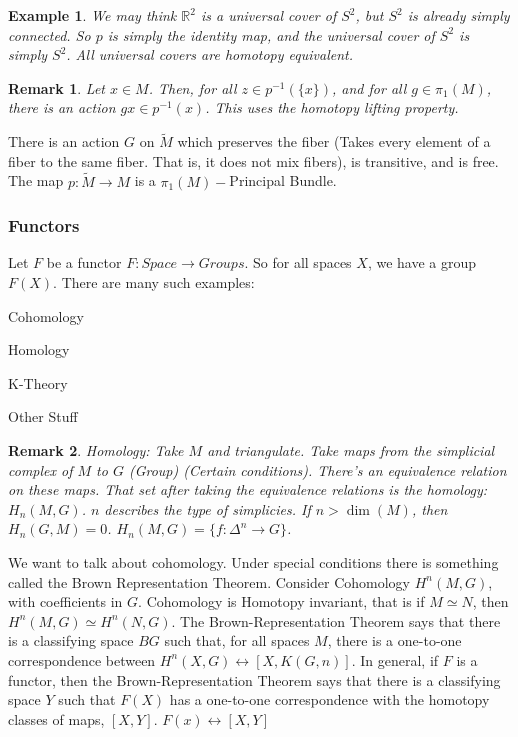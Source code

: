 \documentclass{article}
\theoremstyle{mystyle}
\newtheorem{example}{Example}[section]
\newtheorem{remark}{Remark}[section]
\begin{document}
\begin{example}
We may think $\mathbb{R}^2$ is a universal cover of $S^{2}$, but $S^{2}$ is already simply connected. So $p$ is simply the identity map, and the universal cover of $S^{2}$ is simply $S^{2}$. All universal covers are homotopy equivalent.
\end{example}
\begin{remark}
Let $x\in M$. Then, for all $z\in p^{-1}(\{x\})$, and for all $g\in \pi_{1}(M)$, there is an action $gx\in p^{-1}(x)$. This uses the homotopy lifting property.
\end{remark}
There is an action $G$ on $\tilde{M}$ which preserves the fiber (Takes every element of a fiber to the same fiber. That is, it does not mix fibers), is transitive, and is free. The map $p:\tilde{M}\rightarrow M$ is a $\pi_{1}(M)-$Principal Bundle.
\subsubsection{Functors}
Let $F$ be a functor $F:\textit{Space}\rightarrow \textit{Groups}$. So for all spaces $X$, we have a group $F(X)$. There are many such examples:
\begin{itemize}
    \begin{multicols}{4}
        \item Cohomology
        \item Homology
        \item K-Theory
        \item Other Stuff
    \end{multicols}
\end{itemize}
\begin{remark}
Homology: Take $M$ and triangulate. Take maps from the simplicial complex of $M$ to $G$ (Group) (Certain conditions). There's an equivalence relation on these maps. That set after taking the equivalence relations is the homology: $H_{n}(M,G)$. $n$ describes the type of simplicies. If $n > \dim(M)$, then $H_{n}(G,M) = 0$. $H_{n}(M,G) = \{f:\Delta^{n}\rightarrow G\}$.
\end{remark}
We want to talk about cohomology. Under special conditions there is something called the Brown Representation Theorem. Consider Cohomology $H^{n}(M,G)$, with coefficients in $G$. Cohomology is Homotopy invariant, that is if $M \simeq N$, then $H^{n}(M,G) \simeq H^{n}(N,G)$. The Brown-Representation Theorem says that there is a classifying space $BG$ such that, for all spaces $M$, there is a one-to-one correspondence between $H^{n}(X,G) \leftrightarrow [X,K(G,n)]$. In general, if $F$ is a functor, then the Brown-Representation Theorem says that there is a classifying space $Y$ such that $F(X)$ has a one-to-one correspondence with the homotopy classes of maps, $[X,Y]$. $F(x) \leftrightarrow [X,Y]$
\end{document}
